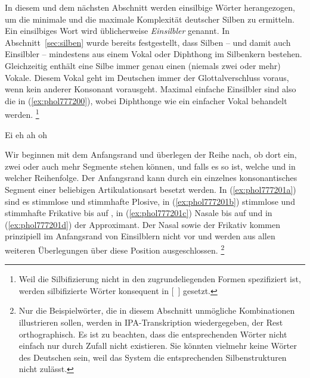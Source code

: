 \label{sec:anfangsrandimeinsilbler}

In diesem und dem nächsten Abschnitt werden einsilbige Wörter herangezogen, um die minimale und die maximale Komplexität deutscher Silben zu ermitteln.
Ein einsilbiges Wort wird üblicherweise \textit{Einsilbler} genannt.
In Abschnitt~\ref{sec:silben} wurde bereits festgestellt, dass Silben -- und damit auch Einsilbler -- mindestens aus einem Vokal oder Diphthong im Silbenkern bestehen.
Gleichzeitig enthält eine Silbe immer genau einen (niemals zwei oder mehr) Vokale.
Diesem Vokal geht im Deutschen immer der Glottalverschluss voraus, wenn kein anderer Konsonant vorausgeht.
Maximal einfache Einsilbler sind also die in (\ref{ex:phol777200}), wobei Diphthonge wie ein einfacher Vokal behandelt werden.%
\footnote{Weil die Silbifizierung nicht in den zugrundeliegenden Formen spezifiziert ist, werden silbifizierte Wörter konsequent in [~] gesetzt.}

\begin{exe}
  \ex\label{ex:phol777200}
  \begin{xlist}
    \ex Ei \textipa{[P\t{aE}]}
    \ex eh \textipa{[Pe:]}
    \ex ah \textipa{[Pa:]}
    \ex oh \textipa{[Po:]}
  \end{xlist}
\end{exe}

Wir beginnen mit dem Anfangsrand und überlegen der Reihe nach, ob dort ein, zwei oder auch mehr Segmente stehen können, und falls es so ist, welche und in welcher Reihenfolge.
Der Anfangsrand kann durch ein einzelnes konsonantisches Segment einer beliebigen Artikulationsart besetzt werden.
In (\ref{ex:phol777201a}) sind es stimmlose und stimmhafte Plosive, in (\ref{ex:phol777201b}) stimmlose und stimmhafte Frikative bis auf \textipa{[\c{c}]}, in (\ref{ex:phol777201c}) Nasale bis auf \textipa{[N]} und in (\ref{ex:phol777201d}) der Approximant.
Der Nasal \textipa{[N]} sowie der Frikativ \textipa{[\c{c}]} kommen prinzipiell im Anfangsrand von Einsilblern nicht vor und werden aus allen weiteren Überlegungen über diese Position ausgeschlossen.%
\footnote{Nur die Beispielwörter, die in diesem Abschnitt unmögliche Kombinationen illustrieren sollen, werden in IPA-Transkription wiedergegeben, der Rest orthographisch.
Es ist zu beachten, dass die entsprechenden Wörter nicht einfach nur durch Zufall nicht existieren.
Sie könnten vielmehr keine Wörter des Deutschen sein, weil das System die entsprechenden Silbenstrukturen nicht zulässt.}

\begin{exe}
  \ex\label{ex:phol777201}
  \begin{xlist}
  \end{xlist}
\end{exe}

